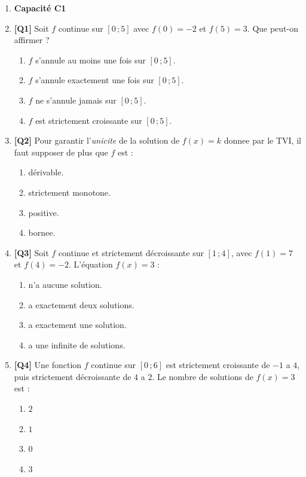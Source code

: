 \begin{enumerate}

\item[] \textbf{Capacité C1}

\item \textbf{[Q1]} Soit $f$ continue sur $[0\,;5]$ avec $f(0) = -2$ et $f(5) = 3$. Que peut-on affirmer ?
  \begin{enumerate}[label=\Alph*.]
    \item $f$ s'annule au moins une fois sur $[0\,;5]$.
    \item $f$ s'annule exactement une fois sur $[0\,;5]$.
    \item $f$ ne s'annule jamais sur $[0\,;5]$.
    \item $f$ est strictement croissante sur $[0\,;5]$.
  \end{enumerate}

\item \textbf{[Q2]} Pour garantir l'\emph{unicite} de la solution de $f(x) = k$ donnee par le TVI, il faut supposer de plus que $f$ est :
  \begin{enumerate}[label=\Alph*.]
    \item dérivable.
    \item strictement monotone.
    \item positive.
    \item bornee.
  \end{enumerate}

\item \textbf{[Q3]} Soit $f$ continue et strictement décroissante sur $[1\,;4]$, avec $f(1) = 7$ et $f(4) = -2$. L'équation $f(x) = 3$ :
  \begin{enumerate}[label=\Alph*.]
    \item n'a aucune solution.
    \item a exactement deux solutions.
    \item a exactement une solution.
    \item a une infinite de solutions.
  \end{enumerate}

\item \textbf{[Q4]} Une fonction $f$ continue sur $[0\,;6]$ est strictement croissante de $-1$ a $4$, puis strictement décroissante de $4$ a $2$. Le nombre de solutions de $f(x) = 3$ est :
  \begin{enumerate}[label=\Alph*.]
    \item $2$
    \item $1$
    \item $0$
    \item $3$
  \end{enumerate}


\end{enumerate}
